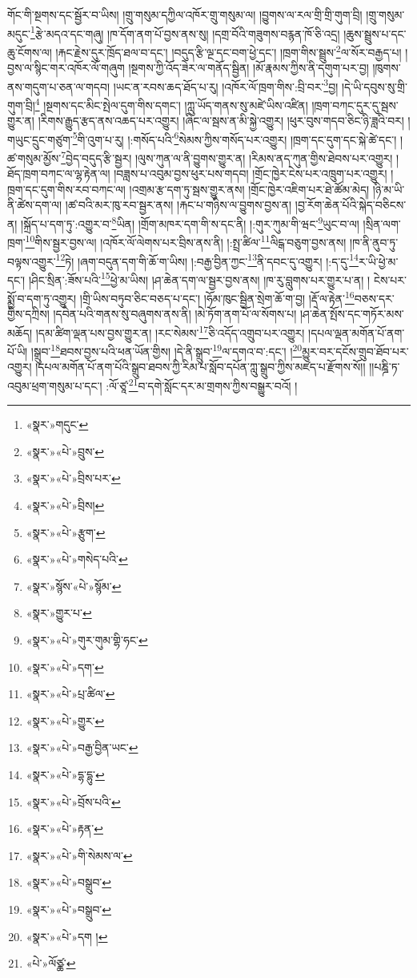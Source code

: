 གོང་གི་སྔགས་དང་སྦྱོར་བ་ཡིས། །གྲུ་གསུམ་དཀྱིལ་འཁོར་གྲུ་གསུམ་ལ། །བྱུགས་ལ་རལ་གྲི་གྲི་གུག་བྲི། །གྲུ་གསུམ་མདུང་\footnote{«སྣར་»གདུང་}རྩེ་མདའ་དང་གཞུ། །ཁ་དོག་ནག་པོ་བྱས་ནས་སུ། །དགྲ་བོའི་གཟུགས་བརྙན་ཁོ་ཅི་འདྲ། །ཆུས་སྦྲུས་པ་དང་ཆུ་ངོགས་ལ། །རྐང་རྗེས་དུར་ཁྲོད་ཐལ་བ་དང་། །བདུད་རྩི་ལྔ་དང་བག་ཕྱེ་དང་། །ཁྲག་གིས་སྦྲུས་\footnote{«སྣར་»«པེ་»བྲུས་}ལ་སོར་བརྒྱད་པ། །བྱས་ལ་སྙིང་གར་འཁོར་ལོ་གཞུག །སྔགས་ཀྱི་འོད་ཟེར་ལ་གནོད་སྦྱིན། །མོ་རྣམས་ཀྱིས་ནི་དགུག་པར་བྱ། །ཁུགས་ནས་གདུག་པ་ཅན་ལ་གདབ། །ཡང་ན་རབས་ཆད་ཐོད་པ་རུ། །འཁོར་ལོ་ཁྲག་གིས་:བྲི་བར་\footnote{«སྣར་»«པེ་»བྲིས་པར་}བྱ། །དེ་ཡི་དབུས་སུ་གྲི་གུག་བྲི།\footnote{«སྣར་»«པེ་»བྲིས།} །སྔགས་དང་མིང་སྤེལ་དུག་གིས་དགང་། །ཀླུ་ཡོད་གནས་སུ་མཛེ་ཡིས་འཛིན། །ཁྲག་བཀང་དུར་དུ་སྦས་གྱུར་ན། །རིགས་རྒྱུད་རྩད་ནས་འཆད་པར་འགྱུར། །ཞིང་ལ་སྦས་ན་མི་སྐྱེ་འགྱུར། །ཕུར་བུས་གདབ་ཅིང་ཉི་ཟླའི་བར། །གཡུང་དྲུང་གཙུག་\footnote{«སྣར་»«པེ་»རྩུག་}གི་འུག་པ་རུ། །:གསོད་པའི་\footnote{«སྣར་»«པེ་»གསེད་པའི་}སེམས་ཀྱིས་གསོད་པར་འགྱུར། །ཁྲག་དང་དུག་དང་སྐེ་ཚེ་དང་། །ཚ་གསུམ་མྱོས་\footnote{«སྣར་»སྙོས་«པེ་»སྙོམ་}བྱེད་བདུད་རྩི་སྦྱར། །ལུས་ཀུན་ལ་ནི་བྱུགས་གྱུར་ན། །རིམས་ནད་ཀུན་གྱིས་ཐེབས་པར་འགྱུར། །ཐོད་ཁྲག་བཀང་ལ་ལྷ་རྟེན་ལ། །བཟླས་པ་འབུམ་བྱས་ཕུར་པས་གདབ། །གྲོང་ཁྱེར་ངེས་པར་འཁྲུག་པར་འགྱུར། །ཁྲག་དང་དུག་གིས་རབ་བཀང་ལ། །འགྲམ་རྩ་དག་ཏུ་སྦས་གྱུར་ནས། །གྲོང་ཁྱེར་འཇིག་པར་ཐེ་ཚོམ་མེད། །ཉི་མ་ཡི་ནི་ཚེས་དག་ལ། །ཚ་བའི་མར་ཁུ་རབ་སྦྱར་ནས། །རྐང་པ་གཉིས་ལ་བྱུགས་བྱས་ན། །བྱ་རོག་ཆེན་པོའི་སྐེད་བཅིངས་ན། །སྐྲོད་པ་དག་ཏུ་:འགྱུར་བ་\footnote{«སྣར་»གྱུར་པ་}ཡིན། །གྲོག་མཁར་དག་གི་ས་དང་ནི། །:གུར་ཀུམ་གི་ཝང་\footnote{«སྣར་»«པེ་»གུར་གུམ་གྷི་ཧང་}ཡུང་བ་ལ། །སྲིན་ལག་ཁྲག་\footnote{«སྣར་»«པེ་»དག་}གིས་སྦྱར་བྱས་ལ། །འཁོར་ལོ་ལེགས་པར་བྲིས་ནས་ནི། །:སྤྲ་ཚིལ་\footnote{«སྣར་»«པེ་»པྲ་ཚིལ་}ལིངྒ་བཅུག་བྱས་ནས། །ཁ་ནི་ནུབ་ཏུ་བལྟས་འགྱུར་\footnote{«སྣར་»«པེ་»གྱུར་}ཏེ། །ཞག་བདུན་དག་གི་ཆོ་ག་ཡིས། །:བརྒྱ་བྱིན་ཀྱང་\footnote{«སྣར་»«པེ་»བརྒྱ་བྱིན་ཡང་}ནི་དབང་དུ་འགྱུར། །:ད་དུ་\footnote{«སྣར་»«པེ་»དྷ་དྷུ་}ར་ཡི་ཕྱེ་མ་དང་། །ཤིང་སྲིན་:ཟོས་པའི་\footnote{«སྣར་»«པེ་»བྲོས་པའི་}ཕྱེ་མ་ཡིས། །ཤ་ཆེན་དག་ལ་སྦྱར་བྱས་ནས། །ཁ་རུ་བླུགས་པར་གྱུར་པ་ན། །
ངེས་པར་སྨྱོ་བ་དག་ཏུ་འགྱུར། །གྲི་ཡིས་བཏུབ་ཅིང་བཅད་པ་དང་། །ཧོམ་ཁུང་སྦྱིན་སྲེག་ཆོ་ག་བྱ། །རྡོ་ལ་རྟེན་\footnote{«སྣར་»«པེ་»རྟན་}བཅས་དར་གྱིས་དཀྲིས། །དབེན་པའི་གནས་སུ་བཞུགས་ནས་ནི། །མེ་ཏོག་ནག་པོ་ལ་སོགས་པ། །ཤ་ཆེན་སྤོས་དང་གཏོར་མས་མཆོད། །དམ་ཚིག་ལྡན་པས་བྱས་གྱུར་ན། །རང་སེམས་\footnote{«སྣར་»«པེ་»གི་སེམས་ལ་}ཅི་འདོད་འགྲུབ་པར་འགྱུར། །དཔལ་ལྡན་མགོན་པོ་ནག་པོ་ཡི། །སྒྲུབ་\footnote{«སྣར་»«པེ་»བསྒྲུབ་}ཐབས་བྱས་པའི་ཕན་ཡོན་གྱིས། །དེ་ནི་སྒྲུབ་\footnote{«སྣར་»«པེ་»བསྒྲུབ་}ལ་དགའ་བ་:དང་། །\footnote{«སྣར་»«པེ་»དག །}མྱུར་བར་དངོས་གྲུབ་ཐོབ་པར་འགྱུར། །དཔལ་མགོན་པོ་ནག་པོའི་སྒྲུབ་ཐབས་ཀྱི་རིམ་པ་སློབ་དཔོན་ཀླུ་སྒྲུབ་ཀྱིས་མཛད་པ་རྫོགས་སོ།། །།པཎྜི་ཏ་འབུམ་ཕྲག་གསུམ་པ་དང་། :ལོ་ཙཱ་\footnote{«པེ་»ལོཙྪ་}བ་དགེ་སློང་དར་མ་གྲགས་ཀྱིས་བསྒྱུར་བའོ། ། 